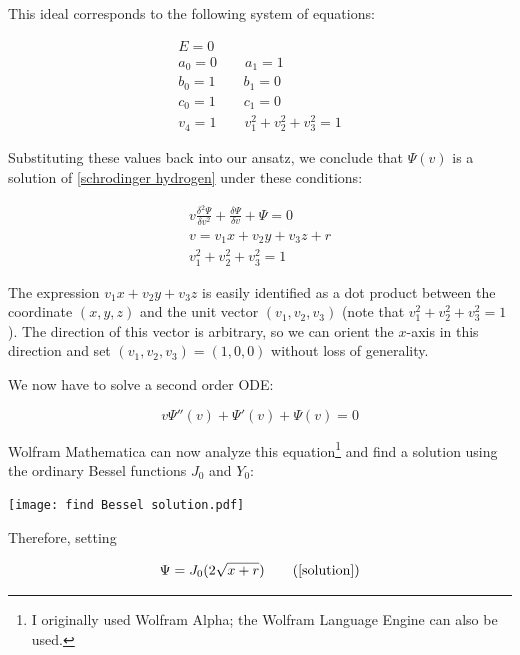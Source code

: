 \documentclass{article}
\begin{document}
This ideal corresponds to the following system of equations:

\begin{equation}
\begin{gathered}
E = 0 \\
a_0 = 0 \qquad
a_1 = 1 \\
b_0 = 1 \qquad
b_1 = 0 \\
c_0 = 1 \qquad
c_1 = 0 \\
v_4 = 1 \qquad
v_1^2 + v_2^2 + v_3^2 = 1
\end{gathered}
\end{equation}

Substituting these values back into our ansatz, we conclude that $\Psi(v)$
is a solution of \eqref{schrodinger hydrogen} under these conditions:

\begin{equation}
\label{related solution}
\begin{gathered}
v \frac{\delta^2\Psi}{\delta v^2} + \frac{\delta\Psi}{\delta v} + \Psi = 0 \\
v = v_1 x+ v_2 y+ v_3 z+r \\
v_1^2 + v_2^2 + v_3^2 = 1
\end{gathered}
\end{equation}

The expression $v_1 x + v_2 y + v_3 z$ is easily identified as a dot product between
the coordinate $(x,y,z)$ and the unit vector $(v_1, v_2, v_3)$ (note
that $v_1^2 + v_2^2 + v_3^2 = 1$).  The direction of this vector is arbitrary,
so we can orient the $x$-axis in this direction and set $(v_1, v_2, v_3) = (1,0,0)$
without loss of generality.

We now have to solve a second order ODE:

\begin{equation}
v \Psi''(v) + \Psi'(v) + \Psi(v) = 0
\end{equation}

Wolfram Mathematica\cite{Mathematica} can now
analyze this equation\footnote{I originally used Wolfram Alpha; the Wolfram Language Engine can also be used.}
and find a solution using the ordinary Bessel functions $J_0$ and $Y_0$:

\texttt{[image: find Bessel solution.pdf]}

Therefore, setting

\begin{equation}
\Psi = J_0(2\sqrt{x+r})
\tag{\ref{solution}}
\end{equation}
\end{document}
